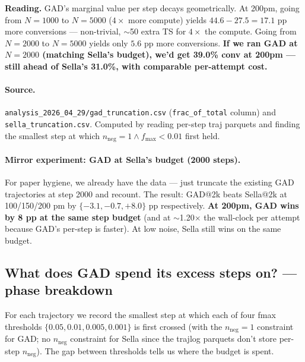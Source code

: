 \documentclass[11pt]{article}
\begin{document}
\textbf{Reading.} GAD's marginal value per step decays geometrically.
At 200pm, going from $N{=}1000$ to $N{=}5000$ ($4\times$ more compute)
yields $44.6 - 27.5 = 17.1$ pp more conversions — non-trivial,
$\sim$50 extra TS for $4\times$ the compute. Going from $N{=}2000$ to
$N{=}5000$ yields only $5.6$ pp more conversions. \textbf{If we ran GAD
at $N{=}2000$ (matching Sella's budget), we'd get 39.0\% conv at 200pm —
still ahead of Sella's 31.0\%, with comparable per-attempt cost.}

\paragraph{Source.} \texttt{analysis\_2026\_04\_29/gad\_truncation.csv}
(\texttt{frac\_of\_total} column) and \texttt{sella\_truncation.csv}.
Computed by reading per-step traj parquets and finding the smallest
step at which $n_{\text{neg}}{=}1 \wedge f_{\max}{<}0.01$ first held.

\paragraph{Mirror experiment: GAD at Sella's budget (2000 steps).}
For paper hygiene, we already have the data — just truncate the existing
GAD trajectories at step 2000 and recount. The result: GAD@2k beats
Sella@2k at 100/150/200 pm by $\{-3.1, -0.7, +8.0\}$ pp respectively.
\textbf{At 200pm, GAD wins by 8 pp at the same step budget} (and
at $\sim$1.20$\times$ the wall-clock per attempt because GAD's per-step
is faster). At low noise, Sella still wins on the same budget.

\subsection{What does GAD spend its excess steps on? — phase breakdown}

For each trajectory we record the smallest step at which each of four
fmax thresholds $\{0.05, 0.01, 0.005, 0.001\}$ is first crossed (with the
$n_{\text{neg}}{=}1$ constraint for GAD; no $n_{\text{neg}}$ constraint
for Sella since the trajlog parquets don't store per-step $n_{\text{neg}}$).
The gap between thresholds tells us where the budget is spent.
\end{document}
